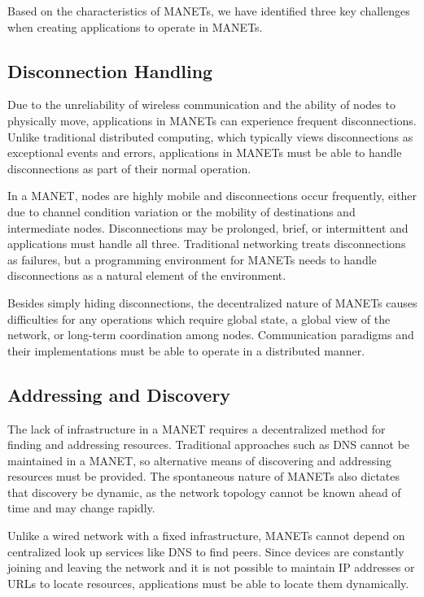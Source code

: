 Based on the characteristics of MANETs, we have identified three key challenges when creating applications to operate in MANETs.

\subsection{Disconnection Handling}

Due to the unreliability of wireless communication and the ability of nodes to physically move, applications in MANETs can experience frequent disconnections. Unlike traditional distributed computing, which typically views disconnections as exceptional events and errors, applications in MANETs must be able to handle disconnections as part of their normal operation.

In a MANET, nodes are highly mobile and disconnections occur frequently, either due to channel condition variation or the mobility of destinations and intermediate nodes. Disconnections may be prolonged, brief, or intermittent and applications must handle all three. Traditional networking treats disconnections as failures, but a programming environment for MANETs needs to handle disconnections as a natural element of the environment.

Besides simply hiding disconnections, the decentralized nature of MANETs causes difficulties for any operations which require global state, a global view of the network, or long-term coordination among nodes. Communication paradigms and their implementations must be able to operate in a distributed manner.

\subsection{Addressing and Discovery}

The lack of infrastructure in a MANET requires a decentralized method for finding and addressing resources. Traditional approaches such as DNS cannot be maintained in a MANET, so alternative means of discovering and addressing resources must be provided. The spontaneous nature of MANETs also dictates that discovery be dynamic, as the network topology cannot be known ahead of time and may change rapidly.

Unlike a wired network with a fixed infrastructure, MANETs cannot depend on centralized look up services like DNS to find peers. Since devices are constantly joining and leaving the network and it is not possible to maintain IP addresses or URLs to locate resources, applications must be able to locate them dynamically.

